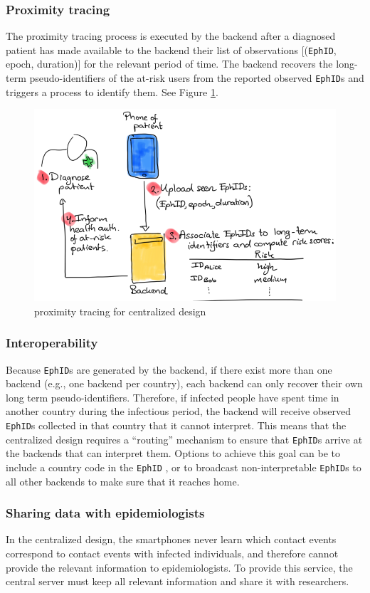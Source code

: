 \documentclass[12pt,a4paper]{article}
\begin{document}
\subsubsection*{Proximity tracing}
The proximity tracing process is executed by the backend after a diagnosed patient has
made available to the backend their list of observations [(\texttt{EphID}, epoch, duration)] for the relevant period of time. The backend recovers the long-term pseudo-identifiers of the at-risk users from the reported observed \texttt{EphID}s and triggers a process to identify them. See Figure \ref{ZY}.
\begin{figure}[H]
\centering
\includegraphics[scale=0.55]{fig/ZY}
\caption{proximity tracing for centralized design}
\label{ZY}
\end{figure}
\subsubsection*{Interoperability}
Because \texttt{EphID}s are generated by the backend, if there exist more than one backend (e.g., one backend per country), each backend can only recover their own long term
pseudo-identifiers. Therefore, if infected people have spent time in another country during the infectious period, the backend will receive observed \texttt{EphID}s collected in that country that it cannot interpret. This means that the centralized design requires a “routing” mechanism to ensure that \texttt{EphID}s arrive at the backends that can interpret them. Options to achieve this goal can be to include a country code in the \texttt{EphID} , or to broadcast non-interpretable \texttt{EphID}s  to all other backends to make sure that it reaches home.
\subsubsection*{Sharing data with epidemiologists}
In the centralized design, the smartphones never learn which contact events correspond to
contact events with infected individuals, and therefore cannot provide the relevant
information to epidemiologists. To provide this service, the central server must keep all
relevant information and share it with researchers.
\end{document}
